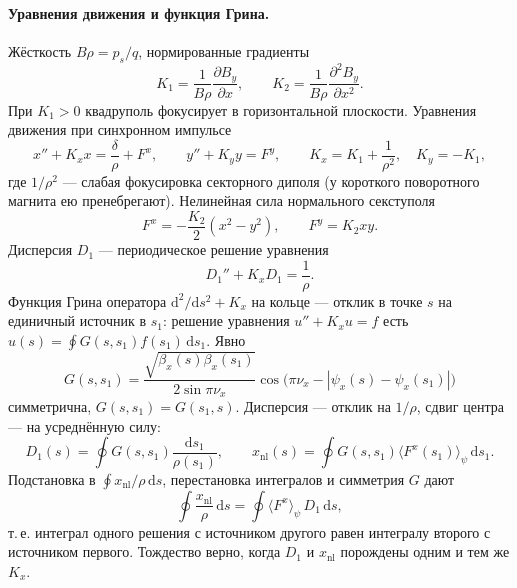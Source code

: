 \paragraph{Уравнения движения и функция Грина.}
Жёсткость $B\rho=p_s/q$, нормированные градиенты
\begin{equation*}
K_1=\frac{1}{B\rho}\frac{\partial B_y}{\partial x},
\qquad
K_2=\frac{1}{B\rho}\frac{\partial^2 B_y}{\partial x^2}.
\end{equation*}
При $K_1>0$ квадруполь фокусирует в горизонтальной плоскости. Уравнения движения при синхронном импульсе
\begin{equation}
\label{eq:hill}
x''+K_x x=\frac{\delta}{\rho}+F^x,
\qquad
y''+K_y y=F^y,
\qquad
K_x=K_1+\frac{1}{\rho^2},
\quad
K_y=-K_1,
\end{equation}
где $1/\rho^2$ --- слабая фокусировка секторного диполя (у короткого поворотного магнита ею пренебрегают). Нелинейная сила нормального секступоля
\begin{equation}
\label{eq:Fsext}
F^x=-\frac{K_2}{2}(x^2-y^2),
\qquad
F^y=K_2 xy.
\end{equation}
Дисперсия $D_1$ --- периодическое решение уравнения
\begin{equation}
\label{eq:D1}
D_1''+K_x D_1=\frac{1}{\rho}.
\end{equation}
Функция Грина оператора $\mathrm{d}^2/\mathrm{d}s^2+K_x$ на кольце --- отклик в точке $s$ на единичный источник в $s_1$: решение уравнения $u''+K_x u=f$ есть $u(s)=\oint G(s,s_1)f(s_1)\,\mathrm{d}s_1$. Явно
\begin{equation}
\label{eq:green}
G(s,s_1)
=\frac{\sqrt{\beta_x(s)\beta_x(s_1)}}{2\sin\pi\nu_x}
\cos\bigl(\pi\nu_x-|\psi_x(s)-\psi_x(s_1)|\bigr)
\end{equation}
симметрична, $G(s,s_1)=G(s_1,s)$. Дисперсия --- отклик на $1/\rho$, сдвиг центра --- на усреднённую силу:
\begin{equation}
\label{eq:D1-green}
D_1(s)=\oint G(s,s_1)\frac{\mathrm{d}s_1}{\rho(s_1)},
\qquad
x_{\mathrm{nl}}(s)=\oint G(s,s_1)\langle F^x(s_1)\rangle_\psi\,\mathrm{d}s_1.
\end{equation}
Подстановка в $\oint x_{\mathrm{nl}}/\rho\,\mathrm{d}s$, перестановка интегралов и симметрия $G$ дают
\begin{equation}
\label{eq:xnl-id}
\oint\frac{x_{\mathrm{nl}}}{\rho}\,\mathrm{d}s
=\oint\langle F^x\rangle_\psi\,D_1\,\mathrm{d}s,
\end{equation}
т.\,е. интеграл одного решения с источником другого равен интегралу второго с источником первого. Тождество верно, когда $D_1$ и $x_{\mathrm{nl}}$ порождены одним и тем же $K_x$.

